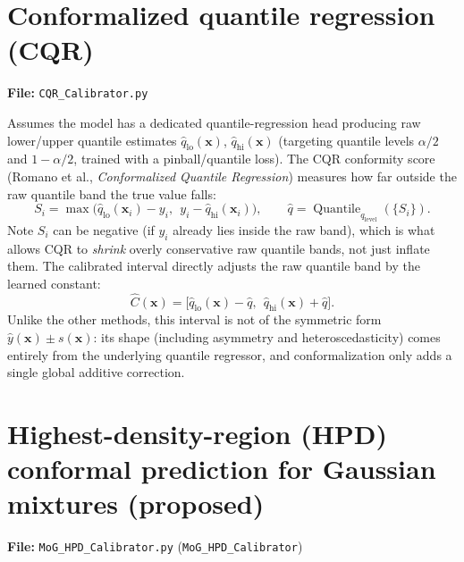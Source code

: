 \documentclass[11pt]{article}
\begin{document}
\section{Conformalized quantile regression (CQR)}
\label{sec:cqr}
\textbf{File:} \texttt{CQR\_Calibrator.py}

Assumes the model has a dedicated quantile-regression head producing raw lower/upper quantile
estimates $\hat{q}_{\mathrm{lo}}(\bm{x})$, $\hat{q}_{\mathrm{hi}}(\bm{x})$ (targeting quantile
levels $\alpha/2$ and $1-\alpha/2$, trained with a pinball/quantile loss). The CQR conformity score
(Romano et al., \emph{Conformalized Quantile Regression}) measures how far outside the raw quantile
band the true value falls:
\begin{equation}
S_i = \max\big(\hat{q}_{\mathrm{lo}}(\bm{x}_i) - y_i,\ \ y_i -
\hat{q}_{\mathrm{hi}}(\bm{x}_i)\big), \qquad
\hat{q} = \operatorname{Quantile}_{q_{\mathrm{level}}}(\{S_i\}).
\end{equation}
Note $S_i$ can be negative (if $y_i$ already lies inside the raw band), which is what allows CQR to
\emph{shrink} overly conservative raw quantile bands, not just inflate them. The calibrated
interval directly adjusts the raw quantile band by the learned constant:
\begin{equation}
\hat{C}(\bm{x}) = \big[\hat{q}_{\mathrm{lo}}(\bm{x}) - \hat{q},\ \ \hat{q}_{\mathrm{hi}}(\bm{x}) +
\hat{q}\big].
\end{equation}
Unlike the other methods, this interval is not of the symmetric form $\hat{y}(\bm{x}) \pm
s(\bm{x})$: its shape (including asymmetry and heteroscedasticity) comes entirely from the
underlying quantile regressor, and conformalization only adds a single global additive correction.

\section{Highest-density-region (HPD) conformal prediction for Gaussian mixtures (proposed)}
\label{sec:mog-hpd}
\textbf{File:} \texttt{MoG\_HPD\_Calibrator.py} (\texttt{MoG\_HPD\_Calibrator})
\end{document}
